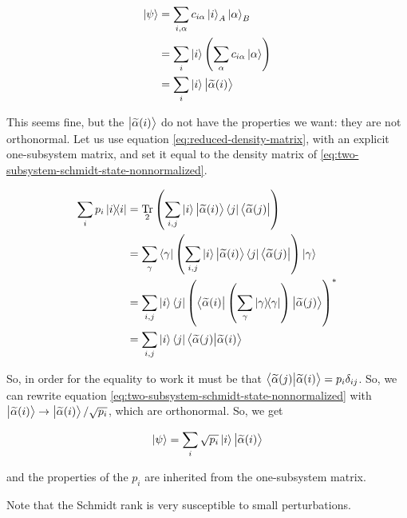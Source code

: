 \documentclass[main.tex]{subfiles}
\begin{document}
\begin{subequations}
\begin{align}
  \ket\psi &=  \sum _{i, \alpha} c_{i \alpha} \ket{i}_A \ket{ \alpha}_B  \\
  &= \sum _{i}  \ket{i} \qty(\sum _{\alpha} c_{i \alpha} \ket{\alpha})  \\
  &= \sum _{i}  \ket{i} \ket{\widetilde{\alpha} (i) } \label{eq:two-subsystem-schmidt-state-nonnormalized}
\end{align}
\end{subequations}

This seems fine,  but the \(\ket{\widetilde{\alpha}(i) } \) do not have the properties we want: they are not orthonormal.
Let us use equation \eqref{eq:reduced-density-matrix}, with an explicit one-subsystem matrix, and set it equal to the density matrix of \eqref{eq:two-subsystem-schmidt-state-nonnormalized}.

\begin{subequations}
\begin{align}
  \sum _{i} p_i \dyad{i}   &= \Tr_2 \qty(\sum _{i,j}  \ket{i} \ket{\widetilde{\alpha} (i)} \bra{j} \bra{\widetilde{\alpha }(j)})  \\
  &= \sum _{\gamma} \bra{\gamma}  \qty(\sum _{i,j}  \ket{i} \ket{\widetilde{\alpha} (i)} \bra{j} \bra{\widetilde{\alpha }(j)}) \ket{\gamma}  \\
  &= \sum _{i,j}  \ket{i}\bra{j}
  \qty(\bra{\widetilde{\alpha} (i)} \qty(\sum _\gamma \dyad{\gamma})  \ket{\widetilde{\alpha }(j)})^*  \\
  &= \sum _{i,j}  \ket{i}\bra{j}
  \braket{\widetilde{\alpha} (j)}{\widetilde{\alpha} (i)}
\end{align}
\end{subequations}

So, in order for the equality to work it must be that \(\braket{\widetilde{\alpha} (j)}{\widetilde{\alpha} (i)} = p_i \delta_{ij}\). So, we can rewrite equation \eqref{eq:two-subsystem-schmidt-state-nonnormalized} with \(\ket{\widetilde{\alpha}(i) }  \rightarrow  \ket{\widetilde{\alpha} (i) } / \sqrt{p_i} \), which are orthonormal.
So, we get

\begin{equation}
    \ket{\psi} = \sum _{i} \sqrt{p_i}  \ket{i} \ket{\widetilde{\alpha} (i) }
\end{equation}

and the properties of the \(p_i\) are inherited from the one-subsystem matrix.

Note that the Schmidt rank is very susceptible to small perturbations.
\end{document}
